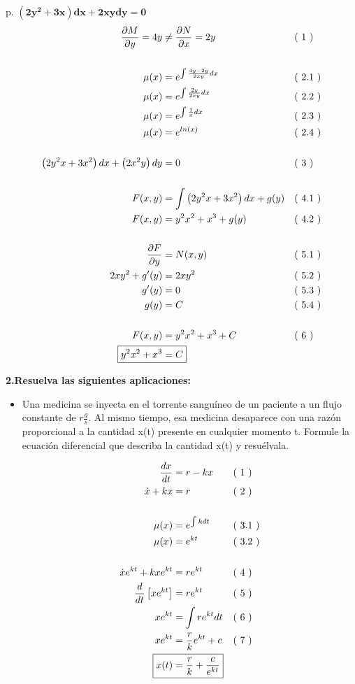 \documentclass{article}
\newcommand{\newLine}[3]{ #1 & = #2 && \text{(#3)}\\ }
\newcommand{\finalAnswer}[2]{ \Aboxed{ #1 & = #2 } }
\newcommand{\p}[1]{ \left( #1 \right) }
\newcommand{\brackets}[1]{ \left[ #1 \right] }
\newcommand{\newProblem}[2]{ \hspace{10mm} #1. $
\boldsymbol{ #2 }
$  \break }
\newcommand{\e}[1]{e^{#1}}
\newcommand{\notEqual}[3]{ #1 & \neq #2 && \text{(#3)}\\ }
\newcommand{\pD}[2]{ \frac{\partial #1}{\partial #2} }
\begin{document}
\begin{flushleft}
            \newProblem{p}{ \p{2y^2 + 3x}dx + 2xydy = 0 }
                \begin{align*}
                    \notEqual{ \pD{M}{y} = 4y } { \pD{N}{x} = 2y } { 1 }
                    \\
                    \newLine{ \mu (x) }{ \e{ \int \frac{4y-2y}{2xy} dx} }{ 2.1 }
                    \newLine{ \mu (x) } { \e{ \int \frac{2y}{2xy} dx} } { 2.2 }
                    \newLine{ \mu(x) } { \e{ \int \frac{1}{x} dx} } { 2.3 }
                    \newLine{ \mu(x) } { \e{ ln(x) } } { 2.4 }
                    \\
                        \newLine{ \p{2y^2 x + 3x^2}dx + \p{2x^2y}dy } { 0 } { 3 }
                    \\
                        \newLine{ F(x,y) } { \int \p{2y^2 x + 3x^2}dx + g(y) } { 4.1 }
                        \newLine{ F(x,y) } { y^2 x^2 + x^3 + g(y) } { 4.2 }
                    \\
                        \newLine{ \pD{F}{y} } { N(x,y) } { 5.1 }
                        \newLine{ 2x y^2 + g'(y) } { 2x y^2 } { 5.2 }
                        \newLine{ g'(y) } { 0 } { 5.3 }
                        \newLine{ g(y) } { C } { 5.4 }
                    \\
                    \newLine{ F(x,y) } { y^2 x^2 + x^3 + C } { 6 }
                    \finalAnswer{ y^2 x^2 + x^3 }{ C }
                \end{align*}

        \textbf{2.Resuelva las siguientes aplicaciones:} \\
        \begin{itemize}
            \item Una medicina se inyecta en el torrente sanguíneo de un paciente a un flujo constante de $ r\frac{g}{s} $.
             Al mismo tiempo, esa medicina desaparece con una razón proporcional a la cantidad x(t) presente en cualquier momento t.
             Formule la ecuación diferencial que describa la cantidad x(t) y resuélvala.

             \begin{align*}
                 \newLine{ \frac{dx}{dt} }{ r-kx }{ 1 }
                 \newLine{ \dot{x} + kx }{ r }{ 2 }
                 \\
                 \newLine{ \mu(x) } { \e{\int k dt} } { 3.1 }
                 \newLine{ \mu(x) } { \e{kt} } { 3.2 }
                 \\
                 \newLine{ \dot{x}\e{kt} + kx\e{kt} } { r\e{kt} } { 4 }
                 \newLine{ \frac{d}{dt} \brackets{ x \e{kt} } } { r\e{kt} } { 5 }
                 \newLine{ x \e{kt} } { \int r\e{kt} dt } { 6 }
                 \newLine{ x \e{kt} } { \frac{r}{k} \e{kt} + c} { 7 }
                 \finalAnswer{ x(t) } { \frac{r}{k} + \frac{c}{\e{kt}} }
             \end{align*}


\end{itemize}
\end{flushleft}
\end{document}

